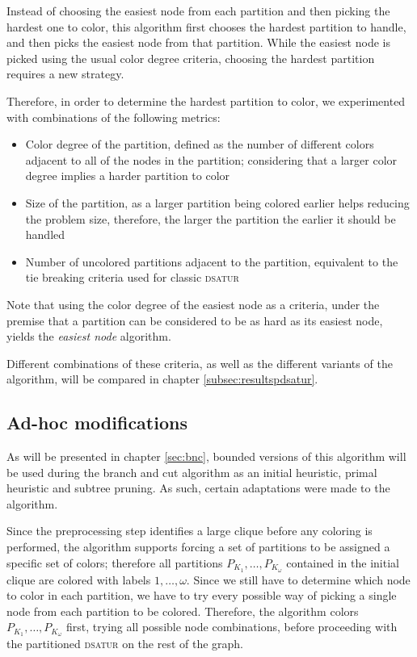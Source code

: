 Instead of choosing the easiest node from each partition and then picking the hardest one to color, this algorithm first chooses the hardest partition to handle, and then picks the easiest node from that partition. While the easiest node is picked using the usual color degree criteria, choosing the hardest partition requires a new strategy. 

Therefore, in order to determine the hardest partition to color, we experimented with combinations of the following metrics:
\begin{itemize}
	\item{Color degree of the partition, defined as the number of different colors adjacent to all of the nodes in the partition; considering that a larger color degree implies a harder partition to color}
	\item{Size of the partition, as a larger partition being colored earlier helps reducing the problem size, therefore, the larger the partition the earlier it should be handled}
	\item{Number of uncolored partitions adjacent to the partition, equivalent to the tie breaking criteria used for classic \textsc{dsatur}} 
\end{itemize}

Note that using the color degree of the easiest node as a criteria, under the premise that a partition can be considered to be as hard as its easiest node, yields the \textit{easiest node} algorithm.

Different combinations of these criteria, as well as the different variants of the algorithm, will be compared in chapter \ref{subsec:resultspdsatur}.

\subsection{Ad-hoc modifications}

As will be presented in chapter \ref{sec:bnc}, bounded versions of this algorithm will be used during the branch and cut algorithm as an initial heuristic, primal heuristic and subtree pruning. As such, certain adaptations were made to the algorithm.

Since the preprocessing step identifies a large clique before any coloring is performed, the algorithm supports forcing a set of partitions to be assigned a specific set of colors; therefore all partitions $P_{K_1},\ldots,P_{K_\omega}$ contained in the initial clique are colored with labels $1,\ldots,\omega$. Since we still have to determine which node to color in each partition, we have to try every possible way of picking a single node from each partition to be colored. Therefore, the algorithm colors $P_{K_1},\ldots,P_{K_\omega}$ first, trying all possible node combinations, before proceeding with the partitioned \textsc{dsatur} on the rest of the graph.

